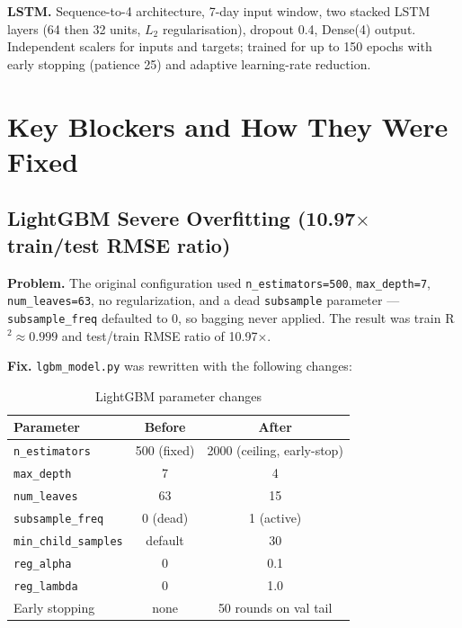\documentclass[11pt,a4paper]{article}
\begin{document}
\textbf{LSTM.}\; Sequence-to-4 architecture, 7-day input window, two stacked LSTM layers
(64 then 32 units, $L_2$ regularisation), dropout 0.4, Dense(4) output. Independent
scalers for inputs and targets; trained for up to 150 epochs with early stopping
(patience 25) and adaptive learning-rate reduction.

\section{Key Blockers and How They Were Fixed}

\subsection{LightGBM Severe Overfitting (10.97$\times$ train/test RMSE ratio)}

\textbf{Problem.}\; The original configuration used \texttt{n\_estimators=500},
\texttt{max\_depth=7}, \texttt{num\_leaves=63}, no regularization, and a dead
\texttt{subsample} parameter — \texttt{subsample\_freq} defaulted to 0, so bagging
never applied. The result was train R$^2\approx0.999$ and test/train RMSE ratio
of 10.97$\times$.

\textbf{Fix.}\; \texttt{lgbm\_model.py} was rewritten with the following changes:

\begin{table}[H]
\centering
\caption{LightGBM parameter changes}
\begin{tabular}{lcc}
\toprule
\textbf{Parameter} & \textbf{Before} & \textbf{After} \\
\midrule
\texttt{n\_estimators}     & 500 (fixed)   & 2000 (ceiling, early-stop) \\
\texttt{max\_depth}        & 7             & 4 \\
\texttt{num\_leaves}       & 63            & 15 \\
\texttt{subsample\_freq}   & 0 (dead)      & 1 (active) \\
\texttt{min\_child\_samples} & default     & 30 \\
\texttt{reg\_alpha}        & 0             & 0.1 \\
\texttt{reg\_lambda}       & 0             & 1.0 \\
Early stopping             & none          & 50 rounds on val tail \\
\bottomrule
\end{tabular}
\end{table}
\end{document}
